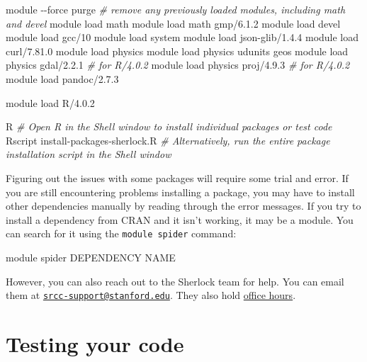 \documentclass[
]{book}
\newenvironment{Shaded}{\begin{snugshade}}{\end{snugshade}}
\newcommand{\AttributeTok}[1]{\textcolor[rgb]{0.13,0.29,0.53}{#1}}
\newcommand{\CommentTok}[1]{\textcolor[rgb]{0.56,0.35,0.01}{\textit{#1}}}
\newcommand{\ExtensionTok}[1]{#1}
\newcommand{\NormalTok}[1]{#1}
\begin{document}
\begin{Shaded}
\begin{Highlighting}[]
\ExtensionTok{module} \AttributeTok{{-}{-}force}\NormalTok{ purge }\CommentTok{\# remove any previously loaded modules, including math and devel}
\ExtensionTok{module}\NormalTok{ load math}
\ExtensionTok{module}\NormalTok{ load math gmp/6.1.2}
\ExtensionTok{module}\NormalTok{ load devel}
\ExtensionTok{module}\NormalTok{ load gcc/10}
\ExtensionTok{module}\NormalTok{ load system}
\ExtensionTok{module}\NormalTok{ load json{-}glib/1.4.4}
\ExtensionTok{module}\NormalTok{ load curl/7.81.0}
\ExtensionTok{module}\NormalTok{ load physics}
\ExtensionTok{module}\NormalTok{ load physics udunits geos}
\ExtensionTok{module}\NormalTok{ load physics gdal/2.2.1 }\CommentTok{\# for R/4.0.2}
\ExtensionTok{module}\NormalTok{ load physics proj/4.9.3 }\CommentTok{\# for R/4.0.2}
\ExtensionTok{module}\NormalTok{ load pandoc/2.7.3}

\ExtensionTok{module}\NormalTok{ load R/4.0.2}

\ExtensionTok{R} \CommentTok{\# Open R in the Shell window to install individual packages or test code}
\ExtensionTok{Rscript}\NormalTok{ install{-}packages{-}sherlock.R }\CommentTok{\# Alternatively, run the entire package installation script in the Shell window}
\end{Highlighting}
\end{Shaded}

Figuring out the issues with some packages will require some trial and error. If you are still encountering problems installing a package, you may have to install other dependencies manually by reading through the error messages. If you try to install a dependency from CRAN and it isn't working, it may be a module. You can search for it using the \texttt{module\ spider} command:

\begin{Shaded}
\begin{Highlighting}[]
\ExtensionTok{module}\NormalTok{ spider DEPENDENCY NAME}
\end{Highlighting}
\end{Shaded}

However, you can also reach out to the Sherlock team for help. You can email them at \href{mailto:srcc-support@stanford.edu}{\nolinkurl{srcc-support@stanford.edu}}. They also hold \href{https://jumpstartsrcc.sites.stanford.edu/events/series/sherlock-office-hours}{office hours}.

\section{Testing your code}\label{testing-your-code}
\end{document}

